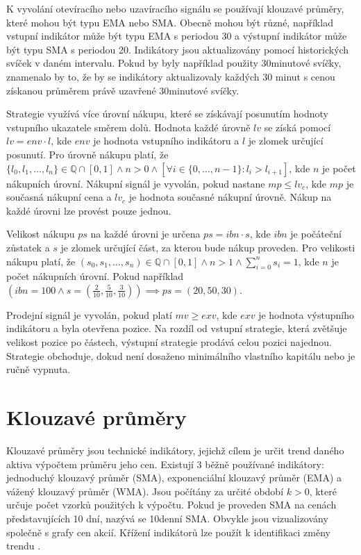 K vyvolání otevíracího nebo uzavíracího signálu se používají klouzavé průměry, které mohou být typu EMA nebo SMA.
Obecně mohou být různé, například vstupní indikátor může být typu EMA s periodou 30 a výstupní indikátor může být typu SMA s periodou 20.
Indikátory jsou aktualizovány pomocí historických svíček v daném intervalu.
Pokud by byly například použity 30minutové svíčky, znamenalo by to, že by se indikátory aktualizovaly každých 30 minut s cenou získanou průměrem právě uzavřené 30minutové svíčky.

Strategie využívá více úrovní nákupu, které se získávají posunutím hodnoty vstupního ukazatele směrem dolů.
Hodnota každé úrovně $lv$ se získá pomocí $lv=env \cdot l$, kde $env$ je hodnota vstupního indikátoru a $l$ je zlomek určující posunutí.
Pro úrovně nákupu platí, že $\{l_0, l_1,\dots,l_n\} \in \mathbb{Q} \cap [0, 1] \land n>0 \land [\forall i \in \{0,\dots,n-1\} : l_i > l_{i+1}]$, kde $n$ je počet nákupních úrovní.
Nákupní signál je vyvolán, pokud nastane  $mp\leq lv_c$, kde $mp$ je současná nákupní cena a $lv_c$ je hodnota současné nákupní úrovně.
Nákup na každé úrovni lze provést pouze jednou.

Velikost nákupu $ps$ na každé úrovni je určena $ps=ibn \cdot s$, kde $ibn$ je počáteční zůstatek a $s$ je zlomek určující část, za kterou bude nákup proveden.
Pro velikosti nákupu platí, že $ (s_0, s_1,\dots,s_n) \in \mathbb{Q} \cap [0, 1] \land n>1 \land \sum_{i=0}^{n} s_i = 1 $, kde $n$ je počet nákupních úrovní.
Pokud například $(ibn=100 \land s = (\frac{2}{10}, \frac{5}{10}, \frac{3}{10}))\implies ps=(20, 50, 30)$.

Prodejní signál je vyvolán, pokud platí $mv\geq exv$, kde $exv$ je hodnota výstupního indikátoru a byla otevřena pozice.
Na rozdíl od vstupní strategie, která zvětšuje velikost pozice po částech, výstupní strategie prodává celou pozici najednou.
Strategie obchoduje, dokud není dosaženo minimálního vlastního kapitálu nebo je ručně vypnuta.

\section{Klouzavé průměry}
Klouzavé průměry jsou technické indikátory, jejichž cílem je určit trend daného aktiva výpočtem průměru jeho cen.
Existují 3 běžně používané indikátory: jednoduchý klouzavý průměr (SMA), exponenciální klouzavý průměr (EMA) a vážený klouzavý průměr (WMA).
Jsou počítány za určité období $k>0$, které určuje počet vzorků použitých k výpočtu.
Pokud je proveden SMA na cenách představujících 10 dní, nazývá se 10denní SMA.
Obvykle jsou vizualizovány společně s grafy cen akcií.
Křížení indikátorů lze použít k identifikaci změny trendu  \cite{ma-algorithms}.

